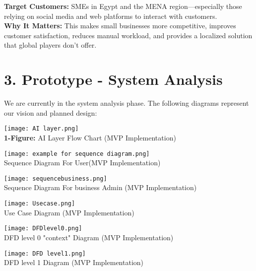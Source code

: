 \documentclass[12pt,a4paper]{article}
\begin{document}
\textbf{Target Customers:} SMEs in Egypt and the MENA region—especially those relying on social media and web 
platforms to interact with customers. \\

\textbf{Why It Matters:} This makes small businesses more competitive, improves customer satisfaction, reduces manual 
workload, and provides a localized solution that global players don't offer. \\

\newpage
\section*{3. Prototype - System Analysis}
We are currently in the system analysis phase. The following diagrams represent our vision and planned design:  
\begin{center}
    \texttt{[image: AI layer.png]}\\
    \textbf{1-Figure:} AI Layer Flow Chart (MVP Implementation)
\end{center}

\begin{center}
    \texttt{[image: example for sequence diagram.png]}
    \\ Sequence Diagram For User(MVP Implementation)
\end{center}
\begin{center}
    \texttt{[image: sequencebusiness.png]}
    \\ Sequence Diagram For business Admin (MVP Implementation)
\end{center}
\begin{center}
     \texttt{[image: Usecase.png]}
   \\ Use Case Diagram (MVP Implementation)
\end{center}

\begin{center}
      \texttt{[image: DFDlevel0.png]}
    \\ DFD level 0 "context" Diagram (MVP Implementation)
\end{center}

\begin{center}
    \texttt{[image: DFD level1.png]}
    \\ DFD level 1 Diagram (MVP Implementation)
\end{center}
\end{document}
